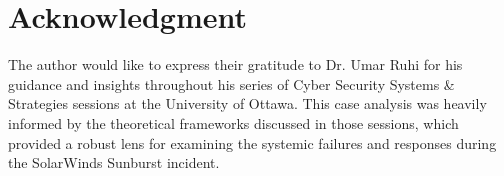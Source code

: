 \documentclass[conference]{IEEEtran}
\begin{document}











\section*{Acknowledgment}
The author would like to express their gratitude to Dr. Umar Ruhi for his guidance and insights throughout his series of Cyber Security Systems \& Strategies sessions at the University of Ottawa. This case analysis was heavily informed by the theoretical frameworks discussed in those sessions, which provided a robust lens for examining the systemic failures and responses during the SolarWinds Sunburst incident.

\glsaddall %
\printglossary[type=\acronymtype,title=List of Acronyms]






\appendices
\onecolumn




\end{document}
